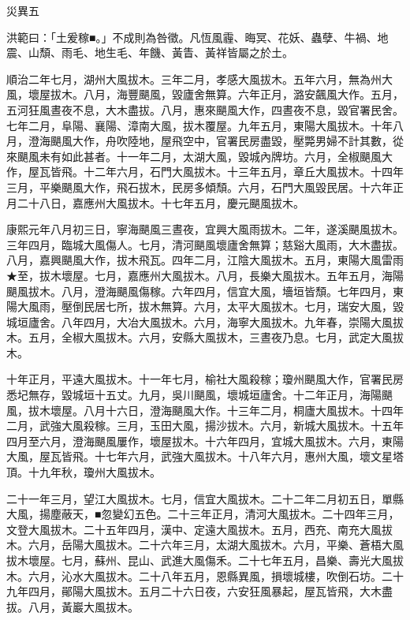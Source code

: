 
\begin{pinyinscope}
災異五

洪範曰：「土爰稼■。」不成則為咎徵。凡恆風霾、晦冥、花妖、蟲孽、牛禍、地震、山頹、雨毛、地生毛、年饑、黃眚、黃祥皆屬之於土。

順治二年七月，湖州大風拔木。三年二月，孝感大風拔木。五年六月，無為州大風，壞屋拔木。八月，海豐颶風，毀廬舍無算。六年正月，潞安飆風大作。五月，五河狂風晝夜不息，大木盡拔。八月，惠來颶風大作，四晝夜不息，毀官署民舍。七年二月，阜陽、襄陽、漳南大風，拔木覆屋。九年五月，東陽大風拔木。十年八月，澄海颶風大作，舟吹陸地，屋飛空中，官署民房盡毀，壓斃男婦不計其數，從來颶風未有如此甚者。十一年二月，太湖大風，毀城內牌坊。六月，全椒颶風大作，屋瓦皆飛。十二年六月，石門大風拔木。十三年五月，章丘大風拔木。十四年三月，平樂颶風大作，飛石拔木，民房多傾頹。六月，石門大風毀民居。十六年正月二十八日，嘉應州大風拔木。十七年五月，慶元颶風拔木。

康熙元年八月初三日，寧海颶風三晝夜，宜興大風雨拔木。二年，遂溪颶風拔木。三年四月，臨城大風傷人。七月，清河颶風壞廬舍無算；慈谿大風雨，大木盡拔。八月，嘉興颶風大作，拔木飛瓦。四年二月，江陰大風拔木。五月，東陽大風雷雨★至，拔木壞屋。七月，嘉應州大風拔木。八月，長樂大風拔木。五年五月，海陽颶風拔木。八月，澄海颶風傷稼。六年四月，信宜大風，墻垣皆頹。七年四月，東陽大風雨，壓倒民居七所，拔木無算。六月，太平大風拔木。七月，瑞安大風，毀城垣廬舍。八年四月，大冶大風拔木。六月，海寧大風拔木。九年春，崇陽大風拔木。五月，全椒大風拔木。六月，安縣大風拔木，三晝夜乃息。七月，武定大風拔木。

十年正月，平遠大風拔木。十一年七月，榆社大風殺稼；瓊州颶風大作，官署民房悉圮無存，毀城垣十五丈。九月，吳川颶風，壞城垣廬舍。十二年正月，海陽颶風，拔木壞屋。八月十六日，澄海颶風大作。十三年二月，桐廬大風拔木。十四年二月，武強大風殺稼。三月，玉田大風，揚沙拔木。六月，新城大風拔木。十五年四月至六月，澄海颶風屢作，壞屋拔木。十六年四月，宜城大風拔木。六月，東陽大風，屋瓦皆飛。十七年六月，武強大風拔木。十八年六月，惠州大風，壞文星塔頂。十九年秋，瓊州大風拔木。

二十一年三月，望江大風拔木。七月，信宜大風拔木。二十二年二月初五日，單縣大風，揚塵蔽天，■忽變幻五色。二十三年正月，清河大風拔木。二十四年三月，文登大風拔木。二十五年四月，漢中、定遠大風拔木。五月，西充、南充大風拔木。六月，岳陽大風拔木。二十六年三月，太湖大風拔木。六月，平樂、蒼梧大風拔木壞屋。七月，蘇州、昆山、武進大風傷禾。二十七年五月，昌樂、壽光大風拔木。六月，沁水大風拔木。二十八年五月，恩縣異風，損壞城樓，吹倒石坊。二十九年四月，鄖陽大風拔木。五月二十六日夜，六安狂風暴起，屋瓦皆飛，大木盡拔。八月，黃巖大風拔木。


\end{pinyinscope}
